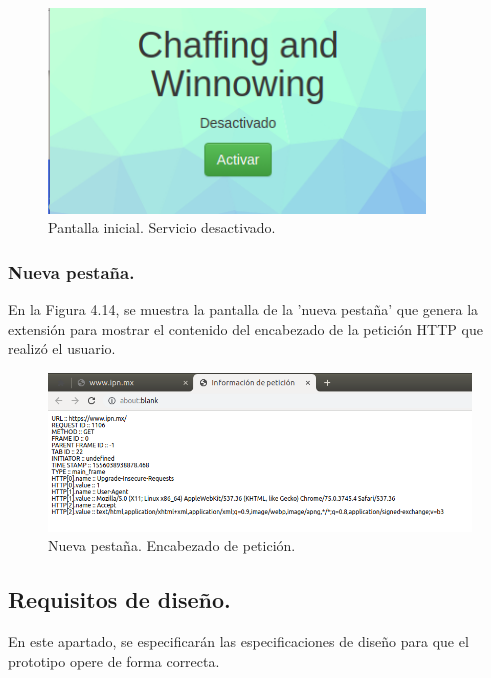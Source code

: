 \documentclass[12pt, a4paper, titlepage]{report}
\begin{document}
				\begin{figure}[H]
					\begin{center}	
					\includegraphics[width=10cm]{./imagenes/Desarrollo/Prototipo_1/UI_desactivado.png}
						\caption{Pantalla inicial. Servicio desactivado.}
					\end{center}
				\end{figure}
				\label{UI_DESACTIVADO_4.8}
				
				\subsubsection{Nueva pestaña.}
				En la Figura 4.14, se muestra la pantalla de la 'nueva pestaña' que genera la extensión para mostrar el contenido del encabezado de la petición HTTP que realizó el usuario.
				
				\begin{figure}[H]
					\begin{center}	\includegraphics[width=13cm]{./imagenes/Desarrollo/Prototipo_1/UI_tabDatos.png}
						\caption{Nueva pestaña. Encabezado de petición.}
					\end{center}
				\end{figure}
				\label{UI_tabDatos_4.9}
			    
			\subsection{Requisitos de diseño.}
			   En este apartado, se especificarán las especificaciones de diseño para que el prototipo opere de forma correcta.
\end{document}
